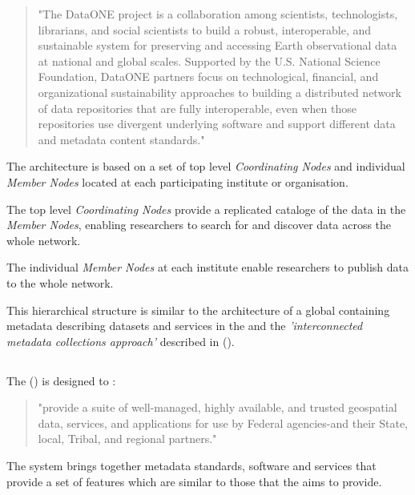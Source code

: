 \documentclass{article}
\begin{document}
\begin{quote}
"The DataONE project is a collaboration among scientists, technologists,
librarians, and social scientists to build a robust, interoperable,
and sustainable system for preserving and accessing Earth observational
data at national and global scales. Supported by the U.S. National
Science Foundation, DataONE partners focus on technological, financial,
and organizational sustainability approaches to building a distributed
network of data repositories that are fully interoperable, even when those
repositories use divergent underlying software and support different data
and metadata content standards."
\end{quote}

The \cite{data-one} architecture is based on a set of top level
\textit{Coordinating Nodes} and individual \textit{Member Nodes} located
at each participating institute or organisation.

The top level \textit{Coordinating Nodes} provide a replicated cataloge of
the data in the \textit{Member Nodes}, enabling researchers to search for
and discover data across the whole network.

The individual \textit{Member Nodes} at each institute enable researchers
to publish data to the whole \cite{data-one} network.

This hierarchical structure is similar to the \cite{vo} architecture of a global
\cite{ivoa-reg} containing metadata describing datasets and services in the
\cite{vo} and the \textit{'interconnected metadata collections approach'}
described in  (\cite{jones-2006}).

\subsection{}

The  (\cite{fgdc})  is designed to :

\begin{quote}
"provide a suite of well-managed, highly available, and trusted geospatial 
data, services, and applications for use by Federal agencies-and their State,
local, Tribal, and regional partners."
\end{quote}

The \cite{fgdc-geo} system brings together metadata standards, software
and services that provide a set of features which are similar to those that
the \cite{trop} aims to provide.
\end{document}

